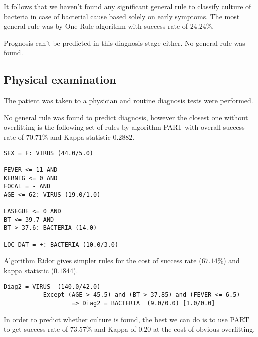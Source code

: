 \documentclass[11pt]{article}
\begin{document}
It follows that we haven't found any significant general rule to classify
culture of bacteria in case of bacterial cause based solely on early symptoms.
The most general rule was by One Rule algorithm with success rate of $24.24\%$.

Prognosis can't be predicted in this diagnosis stage either. No general rule
was found.

\subsection{Physical examination}
The patient was taken to a physician and routine diagnosis tests were
performed.

No general rule was found to predict diagnosis, however the closest one without
overfitting is the following set of rules by algorithm PART with overall
success rate of $70.71\%$ and Kappa statistic $0.2882$.

\begin{verbatim}
SEX = F: VIRUS (44.0/5.0)

FEVER <= 11 AND
KERNIG <= 0 AND
FOCAL = - AND
AGE <= 62: VIRUS (19.0/1.0)

LASEGUE <= 0 AND
BT <= 39.7 AND
BT > 37.6: BACTERIA (14.0)

LOC_DAT = +: BACTERIA (10.0/3.0)
\end{verbatim}

Algorithm Ridor gives simpler rules for the cost of success rate ($67.14\%$) and kappa statistic ($0.1844$).
\begin{verbatim}
Diag2 = VIRUS  (140.0/42.0)
           Except (AGE > 45.5) and (BT > 37.85) and (FEVER <= 6.5) 
                   => Diag2 = BACTERIA  (9.0/0.0) [1.0/0.0]
\end{verbatim}


In order to predict whether culture is found, the best we can do is to use PART
to get success rate of $73.57\%$ and Kappa of $0.20$ at the cost of obvious
overfitting.
\end{document}
